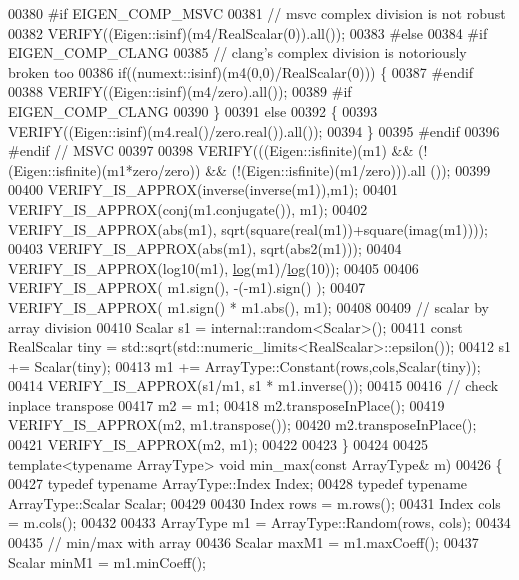\begin{DoxyCode}
00380 \textcolor{preprocessor}{#if EIGEN\_COMP\_MSVC}
00381   \textcolor{comment}{// msvc complex division is not robust}
00382   VERIFY((Eigen::isinf)(m4/RealScalar(0)).all());
00383 \textcolor{preprocessor}{#else}
00384 \textcolor{preprocessor}{#if EIGEN\_COMP\_CLANG}
00385   \textcolor{comment}{// clang's complex division is notoriously broken too}
00386   \textcolor{keywordflow}{if}((numext::isinf)(m4(0,0)/RealScalar(0))) \{
00387 \textcolor{preprocessor}{#endif}
00388     VERIFY((Eigen::isinf)(m4/zero).all());
00389 \textcolor{preprocessor}{#if EIGEN\_COMP\_CLANG}
00390   \}
00391   \textcolor{keywordflow}{else}
00392   \{
00393     VERIFY((Eigen::isinf)(m4.real()/zero.real()).all());
00394   \}
00395 \textcolor{preprocessor}{#endif}
00396 \textcolor{preprocessor}{#endif // MSVC}
00397 
00398   VERIFY(((Eigen::isfinite)(m1) && (!(Eigen::isfinite)(m1*zero/zero)) && (!(Eigen::isfinite)(m1/zero))).all
      ());
00399 
00400   VERIFY\_IS\_APPROX(inverse(inverse(m1)),m1);
00401   VERIFY\_IS\_APPROX(conj(m1.conjugate()), m1);
00402   VERIFY\_IS\_APPROX(abs(m1), sqrt(square(real(m1))+square(imag(m1))));
00403   VERIFY\_IS\_APPROX(abs(m1), sqrt(abs2(m1)));
00404   VERIFY\_IS\_APPROX(log10(m1), \hyperlink{structlog}{log}(m1)/\hyperlink{structlog}{log}(10));
00405 
00406   VERIFY\_IS\_APPROX( m1.sign(), -(-m1).sign() );
00407   VERIFY\_IS\_APPROX( m1.sign() * m1.abs(), m1);
00408 
00409   \textcolor{comment}{// scalar by array division}
00410   Scalar  s1 = internal::random<Scalar>();
00411   \textcolor{keyword}{const} RealScalar tiny = std::sqrt(std::numeric\_limits<RealScalar>::epsilon());
00412   s1 += Scalar(tiny);
00413   m1 += ArrayType::Constant(rows,cols,Scalar(tiny));
00414   VERIFY\_IS\_APPROX(s1/m1, s1 * m1.inverse());
00415 
00416   \textcolor{comment}{// check inplace transpose}
00417   m2 = m1;
00418   m2.transposeInPlace();
00419   VERIFY\_IS\_APPROX(m2, m1.transpose());
00420   m2.transposeInPlace();
00421   VERIFY\_IS\_APPROX(m2, m1);
00422 
00423 \}
00424 
00425 \textcolor{keyword}{template}<\textcolor{keyword}{typename} ArrayType> \textcolor{keywordtype}{void} min\_max(\textcolor{keyword}{const} ArrayType& m)
00426 \{
00427   \textcolor{keyword}{typedef} \textcolor{keyword}{typename} ArrayType::Index Index;
00428   \textcolor{keyword}{typedef} \textcolor{keyword}{typename} ArrayType::Scalar Scalar;
00429 
00430   Index rows = m.rows();
00431   Index cols = m.cols();
00432 
00433   ArrayType m1 = ArrayType::Random(rows, cols);
00434 
00435   \textcolor{comment}{// min/max with array}
00436   Scalar maxM1 = m1.maxCoeff();
00437   Scalar minM1 = m1.minCoeff();

\end{DoxyCode}
